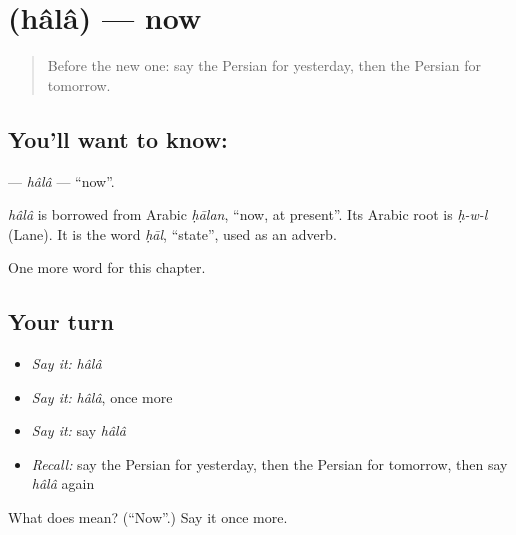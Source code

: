 \section[\texorpdfstring{\fa{حالا} (hâlâ)}{حالا (hâlâ)}]{ (hâlâ) — now}

\label{lesson:FA-C65-hala}



\begin{quote}
Before the new one: say the Persian for yesterday, then the Persian for tomorrow.
\end{quote}

\subsection*{You'll want to know: }
\textbf{} — \emph{hâlâ} — \textquotedblleft{}now\textquotedblright{}.

\begin{cousinweb}
\emph{hâlâ} is borrowed from Arabic \emph{ḥālan}, \textquotedblleft{}now, at present\textquotedblright{}. Its Arabic root is \emph{ḥ-w-l} (Lane). It is the word \emph{ḥāl}, \textquotedblleft{}state\textquotedblright{}, used as an adverb.
\end{cousinweb}

\begin{grammarlens}[title={What you've built}]
One more word for this chapter.
\end{grammarlens}

\subsection*{Your turn}
\begin{itemize}
\raggedright
  \item \emph{Say it:} \emph{hâlâ}
  \item \emph{Say it:} \emph{hâlâ}, once more
  \item \emph{Say it:} say \emph{hâlâ}
  \item \emph{Recall:} say the Persian for yesterday, then the Persian for tomorrow, then say \emph{hâlâ} again
\end{itemize}

\begin{tcolorbox}[breakable,colback=teal!4,colframe=teal!35!black,title={Before you move on}]
What does  mean? (\textquotedblleft{}Now\textquotedblright{}.) Say it once more.
\end{tcolorbox}

